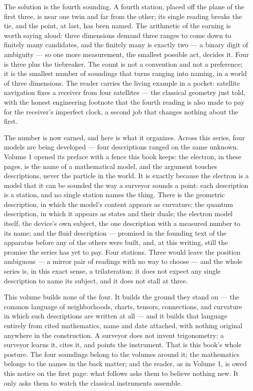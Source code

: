 The solution is the fourth sounding. A fourth station, placed off the plane
of the first three, is near one twin and far from the other; its single
reading breaks the tie, and the point, at last, has been named. The
arithmetic of the earning is worth saying aloud: three dimensions demand
three ranges to come down to finitely many candidates, and the finitely many
is exactly two --- a binary digit of ambiguity --- so one more measurement,
the smallest possible act, decides it. Four is three plus the tiebreaker.
The count is not a convention and not a preference; it is the smallest
number of soundings that turns ranging into naming, in a world of three
dimensions. The reader carries the living example in a pocket: satellite
navigation fixes a receiver from four satellites --- the classical geometry
just told, with the honest engineering footnote that the fourth reading is
also made to pay for the receiver's imperfect clock, a second job that
changes nothing about the first.

The number is now earned, and here is what it organizes. Across this series,
four models are being developed --- four descriptions ranged on the same
unknown. Volume 1 opened its preface with a fence this book keeps: the
electron, in these pages, is the name of a mathematical model, and the
argument touches descriptions, never the particle in the world. It is
exactly because the electron is a model that it can be sounded the way a
surveyor sounds a point: each description is a station, and no single
station names the thing. There is the geometric description, in which the
model's content appears as curvature; the quantum description, in which it
appears as states and their duals; the electron model itself, the device's
own subject, the one description with a measured number to its name; and the
fluid description --- promised in the founding text of the apparatus before
any of the others were built, and, at this writing, still the promise the
series has yet to pay. Four stations. Three would leave the position
ambiguous --- a mirror pair of readings with no way to choose --- and the
whole series is, in this exact sense, a trilateration: it does not expect
any single description to name its subject, and it does not stall at three.

This volume builds none of the four. It builds the ground they stand on ---
the common language of neighborhoods, charts, tensors, connections, and
curvature in which such descriptions are written at all --- and it builds
that language entirely from cited mathematics, name and date attached, with
nothing original anywhere in the construction. A surveyor does not invent
trigonometry; a surveyor learns it, cites it, and points the instrument.
That is this book's whole posture. The four soundings belong to the volumes
around it; the mathematics belongs to the names in the back matter; and the
reader, as in Volume 1, is owed this notice on the first page: what follows
asks them to believe nothing new. It only asks them to watch the classical
instruments assemble.
